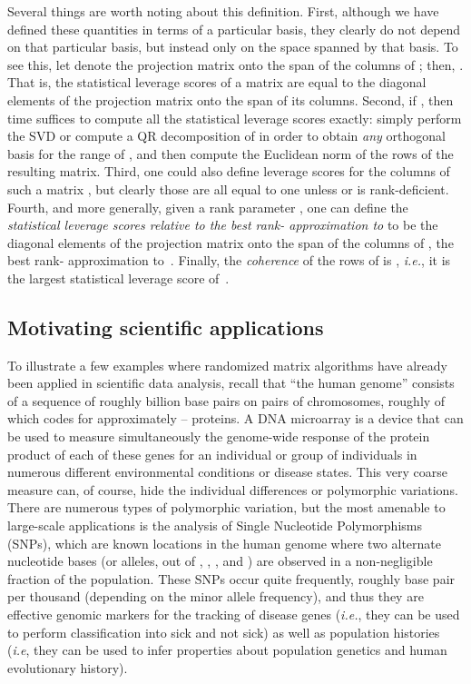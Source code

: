 \documentclass[twoside]{article}
\begin{document}
\noindent 
Several things are worth noting about this definition.
First, although we have defined these quantities in terms of a particular 
basis, they clearly do not depend on that particular basis, but instead 
only on the space spanned by that basis. 
To see this, let  denote the projection matrix onto the span of the 
columns of ; then,
.
That is, the statistical leverage scores of a matrix  are equal to the
diagonal elements of the projection matrix onto the span of its columns.
Second, if , then  time suffices to compute all the 
statistical leverage scores exactly: simply perform the SVD or compute a QR 
decomposition of  in order to obtain \emph{any} orthogonal basis for the 
range of , and then compute the Euclidean norm of the rows of the 
resulting matrix.
Third, one could also define leverage scores for the columns of such a 
matrix , but clearly those are all equal to one unless  or  is
rank-deficient. 
Fourth, and more generally, given a rank parameter , one can define the
\emph{statistical leverage scores relative to the best rank-
approximation to } to be the  diagonal
elements of the projection matrix onto the span of the columns of , the 
best rank- approximation to~.
Finally, the \emph{coherence}  of the rows of  is
, \emph{i.e.}, it is the largest 
statistical leverage score of~.


\subsection{Motivating scientific applications}
\label{sxn:background1:genetics}

To illustrate a few examples where randomized matrix algorithms have already
been applied in scientific data analysis,
recall that ``the human genome'' consists of a sequence of roughly 
 billion base pairs on  pairs of chromosomes, roughly  of 
which codes for approximately  --  proteins.
A DNA microarray is a device that can be used to measure simultaneously the 
genome-wide response of the protein product of each of these genes for an 
individual or group of individuals in numerous different environmental 
conditions or disease states.
This very coarse measure can, of course, hide the individual differences or 
polymorphic variations. 
There are numerous types of polymorphic variation, but the most amenable to 
large-scale applications is the analysis of Single Nucleotide Polymorphisms 
(SNPs), which are known locations in the human genome where two alternate 
nucleotide bases (or alleles, out of , , , and ) are observed in 
a non-negligible fraction of the population.
These SNPs occur quite frequently, roughly  base pair per thousand (depending on the minor allele frequency), and thus they
are effective genomic markers for the tracking of disease genes (\emph{i.e.}, 
they can be used to perform classification into sick and not sick) as well as
population histories (\emph{i.e}, they can be used to infer properties about 
population genetics and human evolutionary history).
\end{document}
